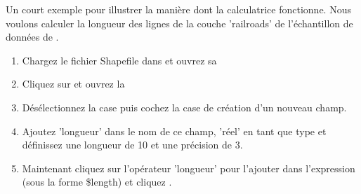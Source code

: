 Un court exemple pour illustrer la manière dont la calculatrice fonctionne. Nous 
voulons calculer la longueur des lignes de la couche 'railroads' de l'échantillon 
de données de \qg.

\begin{enumerate}
\item Chargez le fichier Shapefile  dans \qg et ouvrez 
sa 
\item Cliquez sur et 
ouvrez la 
\item Désélectionnez la case  puis cochez 
la case de création d'un nouveau champ.
\item Ajoutez 'longueur' dans le nom de ce champ, 'réel' en tant que type et 
définissez une longueur de 10 et une précision de 3.
\item Maintenant cliquez sur l'opérateur 'longueur' pour l'ajouter dans 
l'expression (sous la forme \$length) et cliquez .
\end{enumerate}


